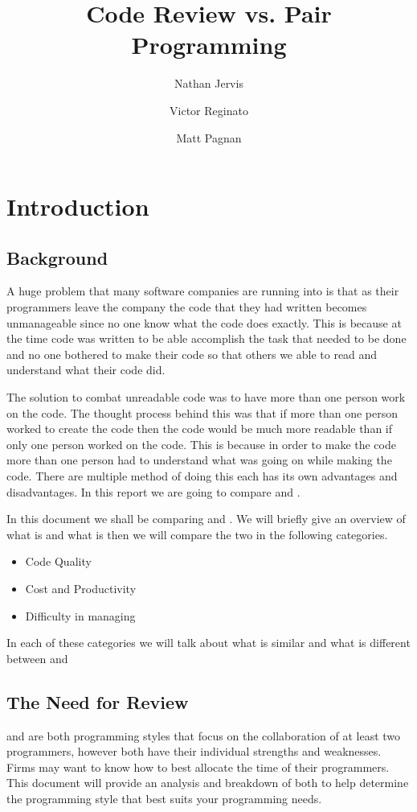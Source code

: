 \documentclass{article}
\title{Code Review vs. Pair Programming}
\author{Nathan Jervis \and Victor Reginato \and Matt Pagnan}
\begin{document}
\maketitle

\tableofcontents

\section{Introduction}

\subsection{Background}
A huge problem that many software companies are running into is that as their programmers leave the company the code that they had written becomes unmanageable since no one know what the code does exactly. This is because at the time code was written to be able accomplish the task that needed to be done and no one bothered to make their code so that others we able to read and understand what their code did.

The solution to combat unreadable code was to have more than one person work on the code. The thought process behind this was that if more than one person worked to create the code then the code would be much more readable than if only one person worked on the code. This is because in order to make the code more than one person had to understand what was going on while making the code. There are multiple method of doing this each has its own advantages and disadvantages. In this report we are going to compare \PP and \CR.

In this document we shall be comparing \PP and \CR. We will briefly give an overview of what \PP is and what \CR is then we will compare the two in the following categories.
\begin{itemize}
\item Code Quality
\item Cost and Productivity
\item Difficulty in managing
\end{itemize}

In each of these categories we will talk about what is similar and what is different between \PP and \CR

\subsection{The Need for Review}
\PP and \CR are both programming styles that focus on the collaboration of at least two programmers, however both have their individual strengths and weaknesses. Firms may want to know how to best allocate the time of their programmers. This document will provide an analysis and breakdown of both to help determine the programming style that best suits your programming needs.
\end{document}
